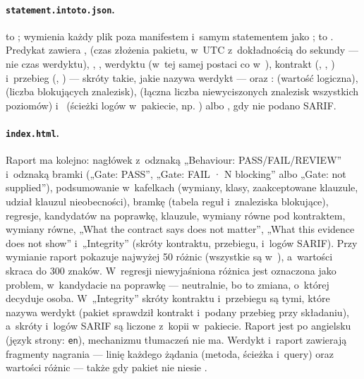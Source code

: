\paragraph{\texttt{statement.intoto.json}.}  to
;  wymienia każdy plik poza
manifestem i~samym statementem jako ;
 to
. Predykat zawiera
,  (czas złożenia pakietu, w~UTC
z~dokładnością do sekundy --- nie czas werdyktu), , ,
 werdyktu (w~tej samej postaci co w~), kontrakt
(, , ) i~przebieg (,
) --- skróty takie, jakie nazywa werdykt --- oraz :
 (wartość logiczna),  (liczba blokujących znalezisk),
 (łączna liczba niewyciszonych znalezisk wszystkich poziomów)
i~ (ścieżki logów w~pakiecie, np. ) albo
, gdy nie podano SARIF.

\paragraph{\texttt{index.html}.} Raport ma kolejno: nagłówek z~odznaką „Behaviour:
PASS/FAIL/REVIEW” i~odznaką bramki („Gate: PASS”, „Gate: FAIL · N blocking” albo „Gate: not
supplied”), podsumowanie w~kafelkach (wymiany, klasy, zaakceptowane klauzule, udział klauzul
nieobecności), bramkę (tabela reguł i~znaleziska blokujące), regresje, kandydatów na
poprawkę, klauzule, wymiany równe pod kontraktem, wymiany równe, „What the contract says does
not matter”, „What this evidence does not show” i~„Integrity” (skróty kontraktu, przebiegu,
 i~logów SARIF). Przy wymianie raport pokazuje najwyżej 50 różnic
(wszystkie są w~), a~wartości skraca do 300 znaków. W~regresji
niewyjaśniona różnica jest oznaczona jako problem, w~kandydacie na poprawkę --- neutralnie,
bo to zmiana, o~której decyduje osoba. W~„Integrity” skróty kontraktu i~przebiegu są tymi,
które nazywa werdykt (pakiet sprawdził kontrakt i~podany przebieg przy składaniu), a~skróty
 i~logów SARIF są liczone z~kopii w~pakiecie. Raport jest po angielsku
(język strony: \texttt{en}), mechanizmu tłumaczeń nie ma. Werdykt i~raport zawierają fragmenty nagrania
--- linię każdego żądania (metoda, ścieżka i~query) oraz wartości różnic --- także gdy pakiet nie niesie
.

